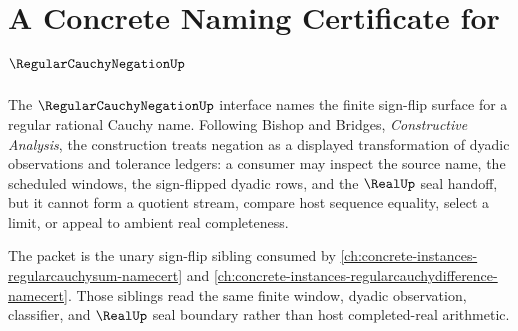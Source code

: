 \chapter{A Concrete Naming Certificate for $\RegularCauchyNegationUp$}
\label{ch:concrete-instances-regularcauchynegation-namecert}

The $\RegularCauchyNegationUp$ interface names the finite sign-flip surface for a regular rational Cauchy name. Following Bishop and Bridges, \emph{Constructive Analysis}, the construction treats negation as a displayed transformation of dyadic observations and tolerance ledgers: a consumer may inspect the source name, the scheduled windows, the sign-flipped dyadic rows, and the $\RealUp$ seal handoff, but it cannot form a quotient stream, compare host sequence equality, select a limit, or appeal to ambient real completeness.

The packet is the unary sign-flip sibling consumed by \autoref{ch:concrete-instances-regularcauchysum-namecert} and \autoref{ch:concrete-instances-regularcauchydifference-namecert}. Those siblings read the same finite window, dyadic observation, classifier, and $\RealUp$ seal boundary rather than host completed-real arithmetic.

